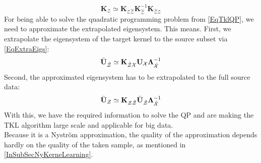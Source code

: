 \begin{equation}
\mathbf{K}_\mathcal{Z} \simeq	\mathbf{K}_{\mathcal{Z\hat{Z}}}\mathbf{K}_\mathcal{\hat{Z}}^{-1}\mathbf{K}_{\mathcal{\hat{Z}Z}}
\end{equation}
For being able to solve the quadratic programming problem from \eqref{EqTklQP}, we need to approximate the extrapolated eigensystem.
This means. First, we extrapolate the eigensystem of the target kernel to the source subset via \eqref{EqExtraEigs}:
\begin{equation}
\bar{\mathbf{U}}_\mathcal{\hat{Z}}\simeq\mathbf{K}_{\mathcal{\hat{Z}X}}\mathbf{U}_{\mathcal{X}}\boldsymbol{\Lambda}_\mathcal{\hat{X}}^{-1}
\end{equation}
Second, the approximated eigensystem has to be extrapolated to the full source data:
\begin{equation}
\bar{\mathbf{U}}_\mathcal{Z} \simeq \mathbf{K}_{\mathcal{Z\hat{Z}}}\bar{\mathbf{U}}_\mathcal{\hat{Z}}\boldsymbol{\Lambda}_\mathcal{\hat{X}}^{-1}
\end{equation}
With this, we have the required information to solve the \acl{QP} and are making the \acs{TKL} algorithm large scale and applicable for big data.\cite{Long.2015}\\
Because it is a Nyström approximation, the quality of the approximation depends hardly on the quality of the taken sample, as mentioned in \ref{InSubSecNyKerneLearning}.